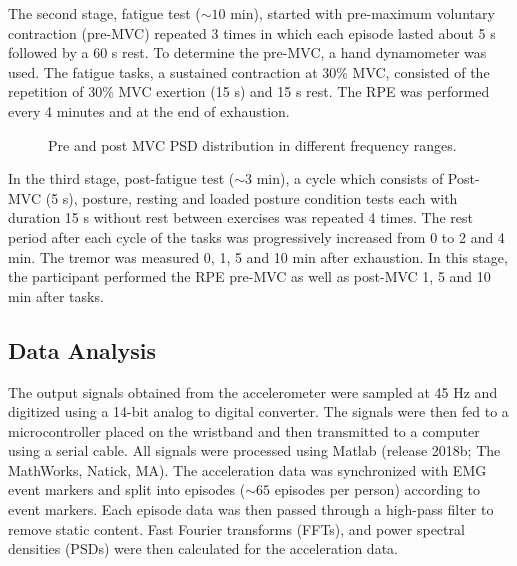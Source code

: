 \documentclass[conference, a4paper]{IEEEtran}
\begin{document}
The second stage, fatigue test ($\sim 10$ min), started with pre-maximum voluntary contraction (pre-MVC) repeated 3 times in which each episode lasted about 5 s followed by a 60 s rest. To determine the pre-MVC, a hand dynamometer was used. The fatigue tasks, a sustained contraction at 30\% MVC, consisted of the repetition of 30\% MVC exertion (15 s) and 15 s rest. The RPE was performed every 4 minutes and at the end of exhaustion.

\begin{figure}[!t]
	\centering
	\label{fig:wrist_pre30MVC}
	\hfill
	\label{fig:wrist_pre30MVC}
	\hfill
	\label{fig:wrist_pre30MVC}
	\medskip
	\label{fig:finger_pre30MVC}
	\hfill
	\label{fig:finger_pre30MVC}
	\hfill
	\label{fig:finger_pre30MVC}
	\caption{Pre and post MVC PSD distribution in different frequency ranges.}
	\label{fig:MVC}
	\medskip
\end{figure}

In the third stage, post-fatigue test ($\sim 3$ min), a cycle which consists of Post-MVC (5 s), posture, resting and loaded posture condition tests each with duration 15 s without rest between exercises was repeated 4 times. The rest period after each cycle of the tasks was progressively increased from 0 to 2 and 4 min. The tremor was measured 0, 1, 5 and 10 min after exhaustion. In this stage, the participant performed the RPE pre-MVC as well as post-MVC 1, 5 and 10 min after tasks.
%

\subsection{Data Analysis}
The output signals obtained from the accelerometer were sampled at 45 Hz and digitized using a 14-bit analog to digital converter. The signals were then fed to a microcontroller placed on the wristband and then transmitted to a computer using a serial cable. All signals were processed using Matlab (release 2018b; The MathWorks, Natick, MA). The acceleration data was synchronized with EMG event markers and split into episodes ($\sim 65$ episodes per person) according to event markers. Each episode data was then passed through a high-pass filter to remove static content. Fast Fourier transforms (FFTs), and power spectral densities (PSDs) were then calculated for the acceleration data.
%
\end{document}
